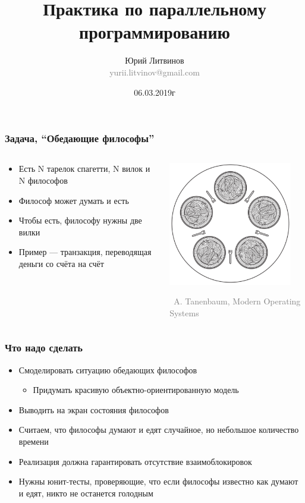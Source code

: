 \documentclass[xetex,mathserif,serif]{beamer}
\title{Практика по параллельному программированию}
\author[Юрий Литвинов]{Юрий Литвинов\\\small{\textcolor{gray}{yurii.litvinov@gmail.com}}}
\date{06.03.2019г}
\newcommand{\attribution}[1] {
\vspace{-5mm}\begin{flushright}\begin{scriptsize}\textcolor{gray}{\textcopyright\, #1}\end{scriptsize}\end{flushright}
}
\begin{document}
	\frame{\titlepage}

	\begin{frame}
		\frametitle{Задача, ``Обедающие философы''}
		\begin{columns}
			\begin{column}{0.5\textwidth}
				\begin{itemize}
					\item Есть N тарелок спагетти, N вилок и N философов
					\item Философ может думать и есть
					\item Чтобы есть, философу нужны две вилки
					\item Пример --- транзакция, переводящая деньги со счёта на счёт
				\end{itemize}
			\end{column}
			\begin{column}{0.5\textwidth}
				\includegraphics[width=0.9\textwidth]{diningPhilosophers.png}
				\attribution{A. Tanenbaum, Modern Operating Systems}
			\end{column}
		\end{columns}
	\end{frame}

	\begin{frame}
		\frametitle{Что надо сделать}
		\begin{itemize}
			\item Смоделировать ситуацию обедающих философов
			\begin{itemize}
				\item Придумать красивую объектно-ориентированную модель
			\end{itemize}
			\item Выводить на экран состояния философов
			\item Считаем, что философы думают и едят случайное, но небольшое количество времени
			\item Реализация должна гарантировать отсутствие взаимоблокировок
			\item Нужны юнит-тесты, проверяющие, что если философы известно как думают и едят, никто не останется голодным
		\end{itemize}
	\end{frame}
	
\end{document}
